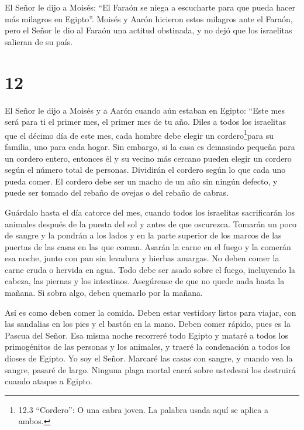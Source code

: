  El Señor le dijo a Moisés: ``El Faraón se niega a
escucharte para que pueda hacer más milagros en Egipto''. 
Moisés y Aarón hicieron estos milagros ante el Faraón, pero el Señor le
dio al Faraón una actitud obstinada, y no dejó que los israelitas
salieran de su país.

\hypertarget{section-11}{%
\section{12}\label{section-11}}

 El Señor le dijo a Moisés y a Aarón cuando aún estaban en
Egipto:  ``Este mes será para ti el primer mes, el primer
mes de tu año.  Diles a todos los israelitas que el décimo
día de este mes, cada hombre debe elegir un cordero\footnote{12.3
  ``Cordero'': O una cabra joven. La palabra usada aquí se aplica a
  ambos.}para su familia, uno para cada hogar.  Sin embargo,
si la casa es demasiado pequeña para un cordero entero, entonces él y su
vecino más cercano pueden elegir un cordero según el número total de
personas. Dividirán el cordero según lo que cada uno pueda comer.
 El cordero debe ser un macho de un año sin ningún defecto,
y puede ser tomado del rebaño de ovejas o del rebaño de cabras.

 Guárdalo hasta el día catorce del mes, cuando todos los
israelitas sacrificarán los animales después de la puesta del sol y
antes de que oscurezca.  Tomarán un poco de sangre y la
pondrán a los lados y en la parte superior de los marcos de las puertas
de las casas en las que coman.  Asarán la carne en el fuego
y la comerán esa noche, junto con pan sin levadura y hierbas amargas.
 No deben comer la carne cruda o hervida en agua. Todo debe
ser asado sobre el fuego, incluyendo la cabeza, las piernas y los
intestinos.  Asegúrense de que no quede nada hasta la
mañana. Si sobra algo, deben quemarlo por la mañana.

 Así es como deben comer la comida. Deben estar vestidosy
listos para viajar, con las sandalias en los pies y el bastón en la
mano. Deben comer rápido, pues es la Pascua del Señor.  Esa
misma noche recorreré todo Egipto y mataré a todos los primogénitos de
las personas y los animales, y traeré la condenación a todos los dioses
de Egipto. Yo soy el Señor.  Marcaré las casas con sangre,
y cuando vea la sangre, pasaré de largo. Ninguna plaga mortal caerá
sobre ustedesni los destruirá cuando ataque a Egipto.

